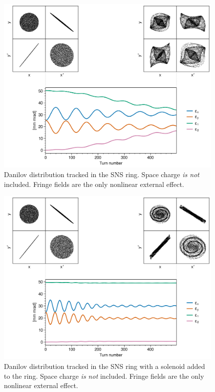 \begin{figure}[!p]
    \centering
    \includegraphics[width=\textwidth]{Images/chapter3/fringe.png}
    \caption{Danilov distribution tracked in the SNS ring. Space charge \textit{is not} included. Fringe fields are the only nonlinear external effect.}
    \label{fig:fringe_a}
    \vspace*{3cm}
\end{figure}

\begin{figure}[!p]
    \centering
    \includegraphics[width=\textwidth]{Images/chapter3/fringe_solenoid.png}
    \caption{Danilov distribution tracked in the SNS ring with a solenoid added to the ring. Space charge \textit{is not} included. Fringe fields are the only nonlinear external effect.}
    \label{fig:fringe_b}
    \vspace*{3cm}
\end{figure}

